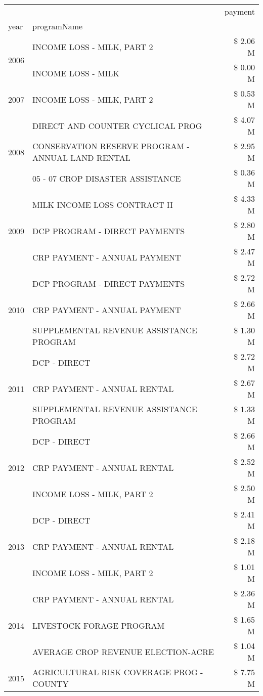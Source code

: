 \begin{tabular}{llr}
\toprule
 &  & payment \\
year & programName &  \\
\midrule
\multirow[t]{2}{*}{2006} & INCOME LOSS - MILK, PART 2 & \$ 2.06 M \\
 & INCOME LOSS - MILK & \$ 0.00 M \\
\cline{1-3}
2007 & INCOME LOSS - MILK, PART 2 & \$ 0.53 M \\
\cline{1-3}
\multirow[t]{3}{*}{2008} & DIRECT AND COUNTER CYCLICAL PROG & \$ 4.07 M \\
 & CONSERVATION RESERVE PROGRAM - ANNUAL LAND RENTAL & \$ 2.95 M \\
 & 05 - 07 CROP DISASTER ASSISTANCE & \$ 0.36 M \\
\cline{1-3}
\multirow[t]{3}{*}{2009} & MILK INCOME LOSS CONTRACT II & \$ 4.33 M \\
 & DCP PROGRAM - DIRECT PAYMENTS & \$ 2.80 M \\
 & CRP PAYMENT - ANNUAL PAYMENT & \$ 2.47 M \\
\cline{1-3}
\multirow[t]{3}{*}{2010} & DCP PROGRAM - DIRECT PAYMENTS & \$ 2.72 M \\
 & CRP PAYMENT - ANNUAL PAYMENT & \$ 2.66 M \\
 & SUPPLEMENTAL REVENUE ASSISTANCE PROGRAM & \$ 1.30 M \\
\cline{1-3}
\multirow[t]{3}{*}{2011} & DCP - DIRECT & \$ 2.72 M \\
 & CRP PAYMENT - ANNUAL RENTAL & \$ 2.67 M \\
 & SUPPLEMENTAL REVENUE ASSISTANCE PROGRAM & \$ 1.33 M \\
\cline{1-3}
\multirow[t]{3}{*}{2012} & DCP - DIRECT & \$ 2.66 M \\
 & CRP PAYMENT - ANNUAL RENTAL & \$ 2.52 M \\
 & INCOME LOSS - MILK, PART 2 & \$ 2.50 M \\
\cline{1-3}
\multirow[t]{3}{*}{2013} & DCP - DIRECT & \$ 2.41 M \\
 & CRP PAYMENT - ANNUAL RENTAL & \$ 2.18 M \\
 & INCOME LOSS - MILK, PART 2 & \$ 1.01 M \\
\cline{1-3}
\multirow[t]{3}{*}{2014} & CRP PAYMENT - ANNUAL RENTAL & \$ 2.36 M \\
 & LIVESTOCK FORAGE PROGRAM & \$ 1.65 M \\
 & AVERAGE CROP REVENUE ELECTION-ACRE & \$ 1.04 M \\
\cline{1-3}
\multirow[t]{3}{*}{2015} & AGRICULTURAL RISK COVERAGE PROG - COUNTY & \$ 7.75 M \\

\end{tabular}
